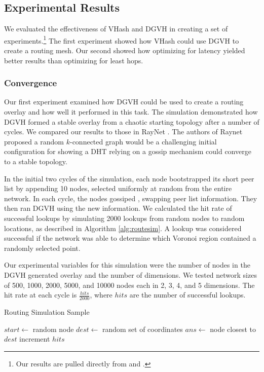 \subsection{Experimental Results}
We evaluated the effectiveness of VHash and DGVH in creating a set of experiments.\footnote{Our results are pulled directly from \cite{dgvh} and \cite{vhash}.}
The first experiment showed how VHash could use DGVH to create a routing mesh.
Our second showed how optimizing for latency yielded better results than optimizing for least hops.

\subsubsection{Convergence}
Our first experiment examined how DGVH could be used to create a routing overlay and how well it performed in this task.
The simulation demonstrated how DGVH  formed a stable overlay from a chaotic starting topology after a number of cycles.
We compared our results to those in RayNet \cite{raynet}.
The authors of Raynet proposed a random $k$-connected graph would be a challenging initial configuration for showing a DHT relying on a gossip mechanism could converge to a stable topology.

In the initial two cycles of the simulation, each node bootstrapped its short peer list by appending 10 nodes, selected uniformly at random from the entire network.
In each cycle, the nodes gossiped , swapping peer list information.
They then ran DGVH using the new information.
We calculated the hit rate of successful lookups by simulating 2000 lookups from random nodes to random locations, as described in Algorithm \ref{alg:routesim}.
A lookup was considered successful if the network was able to determine which Voronoi region contained a randomly selected point.

Our experimental variables for this simulation were the number of nodes in the DGVH generated overlay and the number of dimensions.
We tested network sizes of 500, 1000, 2000, 5000, and 10000 nodes each in 2, 3, 4, and 5 dimensions.
The hit rate at each cycle is $\frac{hits}{2000}$, where $hits$ are the number of successful lookups.




\begin{algorithm}
	\caption{Routing Simulation Sample}
	\label{alg:routesim}
	\begin{algorithmic}[1]  %
		\State $start \leftarrow$ random node
		\State$dest \leftarrow$ random set of coordinates
		\State $ans \leftarrow$ node closest to $dest$
		\State increment $hits$
		\EndIf
	\end{algorithmic}
\end{algorithm}

